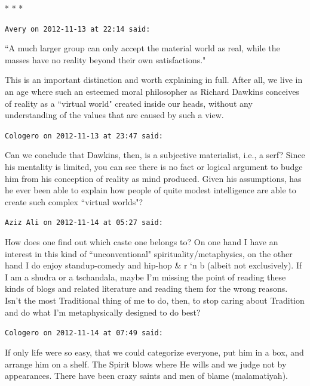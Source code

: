 \begin{center}* * *\end{center}

\begin{footnotesize}\begin{sffamily}



\texttt{Avery on 2012-11-13 at 22:14 said: }

``A much larger group can only accept the material world as real, while the masses have no reality beyond their own satisfactions."

This is an important distinction and worth explaining in full. After all, we live in an age where such an esteemed moral philosopher as Richard Dawkins conceives of reality as a ``virtual world" created inside our heads, without any understanding of the values that are caused by such a view.


\hfill

\texttt{Cologero on 2012-11-13 at 23:47 said: }

Can we conclude that Dawkins, then, is a subjective materialist, i.e., a serf? Since his mentality is limited, you can see there is no fact or logical argument to budge him from his conception of reality as mind produced. Given his assumptions, has he ever been able to explain how people of quite modest intelligence are able to create such complex ``virtual worlds"?


\hfill

\texttt{Aziz Ali on 2012-11-14 at 05:27 said: }

How does one find out which caste one belongs to? On one hand I have an interest in this kind of ``unconventional" spirituality/metaphysics, on the other hand I do enjoy standup-comedy and hip-hop \& r `n b (albeit not exclusively). If I am a shudra or a tschandala, maybe I'm missing the point of reading these kinds of blogs and related literature and reading them for the wrong reasons. Isn't the most Traditional thing of me to do, then, to stop caring about Tradition and do what I'm metaphysically designed to do best?


\hfill

\texttt{Cologero on 2012-11-14 at 07:49 said: }

If only life were so easy, that we could categorize everyone, put him in a box, and arrange him on a shelf. The Spirit blows where He wills and we judge not by appearances. There have been crazy saints and men of blame (malamatiyah).


\end{sffamily}
\end{footnotesize}
